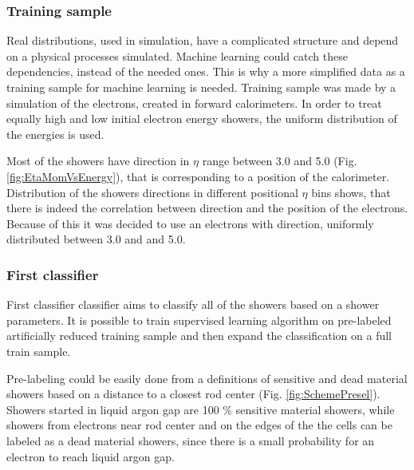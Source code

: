 \subsubsection{Training sample}

Real distributions, used in simulation, have a complicated structure and depend on a physical processes simulated. Machine learning could catch these dependencies, instead of the needed ones. This is why a more simplified data as a training sample for machine learning  is needed.  Training sample was made by a simulation of the electrons, created in forward calorimeters. In order to treat equally high and low initial electron energy showers, the uniform distribution of the energies is used.

Most of the showers have direction in $\eta$ range between 3.0 and 5.0 (Fig. \ref{fig:EtaMomVsEnergy}), that is corresponding to a position of the calorimeter. Distribution of the showers directions in different positional $\eta$ bins shows, that there is indeed the correlation between direction and the position of the electrons. Because of this it was decided to use an electrons with direction, uniformly distributed between 3.0 and and 5.0.


\begin{figure}[!tbp]
\end{figure}

\subsubsection{First classifier}

First classifier classifier aims to classify all of the showers based on a shower parameters. It is possible to train supervised learning algorithm on pre-labeled artificially reduced training sample and then expand the classification on a full train sample. 

Pre-labeling could be easily done from a definitions of sensitive and dead material showers based on a distance to a closest rod center (Fig. \ref{fig:SchemePresel}). Showers started in liquid argon gap are 100 \% sensitive material showers, while showers from electrons near rod center and on the edges of the the cells can be labeled as a dead material showers, since there is a small probability for an electron to reach liquid argon gap.


